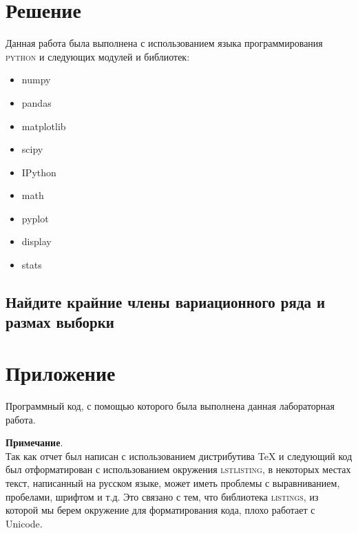 \documentclass[a4paper, 14pt]{extarticle}
\begin{document}
\newpage

\section{Решение}
Данная работа была выполнена с использованием языка программирования 
\textsc{python} и следующих модулей и библиотек: 

\renewcommand{\labelitemi}{\scalebox{0.5}{$\bullet$}}

\begin{center}
    \begin{multicols}{4}
        \begin{itemize}[itemsep=0pt]
            \item numpy
            \item pandas
            \item matplotlib
            \item scipy
            \item IPython
            \item math
            \item pyplot
            \item display
            \item stats
        \end{itemize}
    \end{multicols}
\end{center}

\subsection{Найдите крайние члены вариационного ряда и размах выборки}


\section{Приложение}

Программный код, с помощью которого была выполнена данная лабораторная работа.\\

\vspace{20pt}

\noindent \textbf{Примечание}.\\

\noindent Так как отчет был написан с использованием дистрибутива TeX и 
следующий код был отформатирован с использованием окружения \textsc{lstlisting}, 
в некоторых местах текст, написанный на русском языке, может иметь проблемы 
с выравниванием, пробелами, шрифтом и т.д. Это связано с тем, что библиотека 
\textsc{listings}, из которой мы берем окружение для форматирования кода, 
плохо работает с Unicode.
\end{document}
